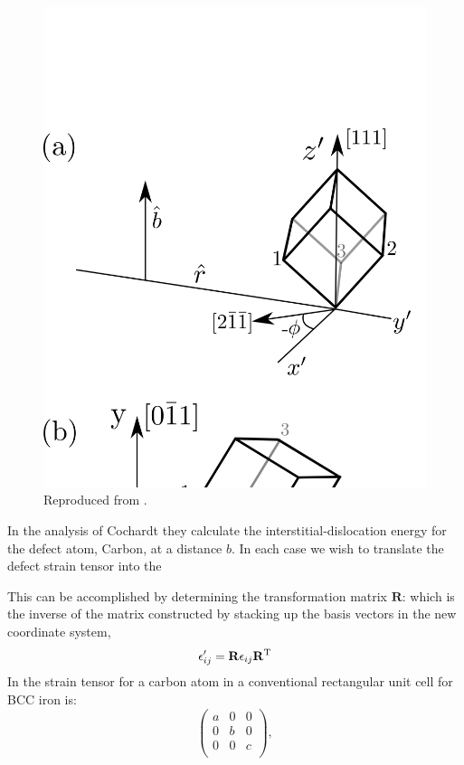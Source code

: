 \begin{figure}[!tbp]
\begin{center}
\includegraphics[scale=0.8]{./metallurgy/screwcoordinate.png}
\caption{\label{fig:interstitialcoords} Reproduced from \cite{cochardt55}.}
\end{center}
\end{figure}
%
In the analysis of Cochardt they calculate the interstitial-dislocation
energy for the defect atom, Carbon, at a distance $b$. In each case we
wish to translate the defect strain tensor into the

This can be accomplished by determining the transformation matrix $\mathbf{R}$:
which is the inverse of the matrix constructed by stacking up
the basis vectors in the new coordinate system,
%
\begin{equation}
\epsilon'_{ij} = \mathbf{R} \epsilon_{ij} \mathbf{R}^{\rm T}
\end{equation}
%
In \cite{cochardt55} the strain tensor for a carbon atom in
a conventional rectangular unit cell for BCC iron is:
%
\begin{equation}
\left(
\begin{array}{ccc}
 a & 0 & 0 \\
 0 & b & 0 \\
 0 & 0 & c  \\
\end{array}
\right),
\end{equation}
%

